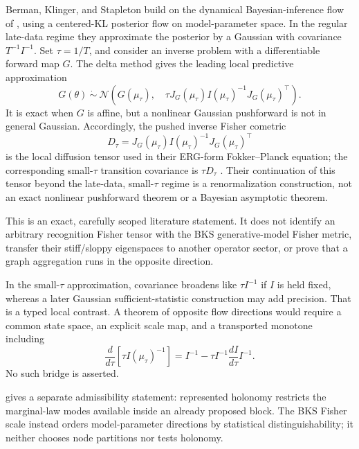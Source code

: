 Berman, Klinger, and Stapleton build on the dynamical Bayesian-inference
flow of \citet{BermanHeckmanKlinger2022}, using a centered-KL posterior flow
on model-parameter space. In the regular late-data regime they approximate the
posterior by a Gaussian with covariance \(T^{-1}I^{-1}\). Set
\(\tau=1/T\), and consider an inverse problem with a differentiable forward
map \(G\). The delta method gives the leading local predictive approximation
\[
G(\theta)\ \dot\sim\
\mathcal N\left(
G(\mu_\tau),\quad
\tau J_G(\mu_\tau) I(\mu_\tau)^{-1}J_G(\mu_\tau)^\top
\right).
\]
It is exact when \(G\) is affine, but a nonlinear Gaussian pushforward is not
in general Gaussian. Accordingly, the pushed inverse Fisher cometric
\begin{equation}
D_\tau
=J_G(\mu_\tau)I(\mu_\tau)^{-1}J_G(\mu_\tau)^\top
\label{eq:rg-bks-diffusion}
\end{equation}
is the local diffusion tensor used in their ERG-form Fokker--Planck equation;
the corresponding small-\(\tau\) transition covariance is
\(\tau D_\tau\) \citep{BermanKlingerStapleton2023}. Their continuation of
this tensor beyond the late-data, small-\(\tau\) regime is a renormalization
construction, not an exact nonlinear pushforward theorem or a Bayesian
asymptotic theorem. \status{ESTABLISHED}

This is an exact, carefully scoped literature statement. It does not identify
an arbitrary recognition Fisher tensor with the BKS generative-model Fisher
metric, transfer their stiff/sloppy eigenspaces to another operator sector, or
prove that a graph aggregation runs in the opposite direction.

In the small-\(\tau\) approximation, covariance broadens
like \(\tau I^{-1}\) if \(I\) is held fixed, whereas a later Gaussian
sufficient-statistic construction may add precision. That is a typed local
contrast. A theorem of opposite flow directions would require a common state
space, an explicit scale map, and a transported monotone including
\[
\frac{d}{d\tau}\left[\tau I(\mu_\tau)^{-1}\right]
=I^{-1}-\tau I^{-1}\frac{dI}{d\tau}I^{-1}.
\]
No such bridge is asserted. 

 gives a separate
admissibility statement: represented holonomy restricts the marginal-law
modes available inside an already proposed block.  The BKS Fisher scale
instead orders model-parameter directions by statistical distinguishability;
it neither chooses node partitions nor tests holonomy. \status{ESTABLISHED}

